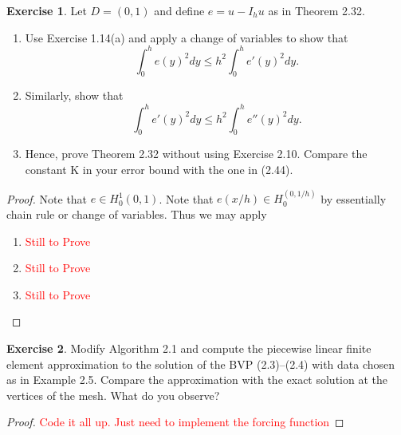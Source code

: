 \documentclass{amsart}
\theoremstyle{plain}
\theoremstyle{definition}
\newtheorem{exer}{Exercise}[section]
\newcommand{\tcr}[1]{\textcolor{red}{#1}}
\begin{document}
\begin{exer}
     Let $D = (0, 1)$ and define $e = u - I_h u$ as in Theorem 2.32.
    \begin{enumerate}[label=\alph*.]
        \item Use Exercise 1.14(a) and apply a change of variables to show that 
        $$\int_0^h e(y)^2 dy \leq h^2 \int_0^h  e'(y)^2 dy.$$
        \item Similarly, show that 
        $$\int_0^h e'(y)^2 dy \leq h^2 \int_0^h e''(y)^2 dy.$$
        \item  Hence, prove Theorem 2.32 without using Exercise 2.10. Compare the constant K in your error bound with the one in (2.44).
    \end{enumerate}
\end{exer}
\begin{proof}
    Note that $e\in H_0^1(0,1)$. Note that $e(x/h) \in H_0^(0,1/h)$ by essentially chain rule or change of variables. Thus we may apply 
    \begin{enumerate}
        \item \tcr{Still to Prove}
        \item \tcr{Still to Prove}
        \item \tcr{Still to Prove}
    \end{enumerate}
\end{proof}

\begin{exer}
    Modify Algorithm 2.1 and compute the piecewise linear finite element approximation to the solution of the BVP (2.3)–(2.4) with data chosen as in Example 2.5. Compare the approximation with the exact solution at the vertices of the mesh. What do you observe?
\end{exer}
\begin{proof}
    \tcr{Code it all up. Just need to implement the forcing function} 
\end{proof}
\end{document}
